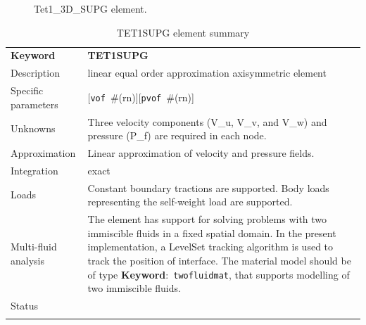 \documentclass[a4paper]{article}
\newcommand{\descitem}[1]{{\noindent \textbf{#1}}:}
\newcommand{\elemkeyword}[1]{\descitem{Keyword}~\param{#1}} %
\newcommand{\param}[1]{\texttt{#1}} %
\newcommand{\optional}[1]{[#1]} %
\newcommand{\field}[2]{\param{#1}~\#{\tiny(#2)}} %
\newcommand{\optField}[2]{\optional{\field{#1}{#2}}}
\newcommand{\templabel}{}%
\newcommand{\tempcaption}{}%
\newcounter{nelpar}
\newenvironment{elementsummary}[5]{%
  \gdef\tempcaption{#4}%
  \gdef\templabel{#5}%
  \setcounter{nelpar}{0}%
  \begin{center} %
    \begin{table}[!htb] %
      \begin{tabular}{|l|p{9cm}|}\hline %
        {\bf Keyword} & \bf{#1}\\ %
        {Description} & {#2}\\ %
        {Specific parameters} & {#3}\\ \hline %
}{
  \\ \hline %
      \end{tabular}%
      \caption{\tempcaption}%
      \label{\templabel}%
    \end{table}%
  \end{center}%
}
\newcommand{\elementDescription}[2]{{#1} & {#2}\\}
\begin{document}
\begin{figure}[htb]
 \centering
 \begin{makeimage}
  
 \end{makeimage}
 \caption{Tet1\_3D\_SUPG element.}
 \label{PY1_3D_SUPGfig}
\end{figure}

\begin{elementsummary}{TET1SUPG}{linear equal order approximation axisymmetric element}
  {\optField{vof}{rn}\optField{pvof}{rn}}{TET1SUPG element summary}{TET1SUPGsummary}
\elementDescription{Unknowns}{Three velocity components (V\_u, V\_v, and V\_w) and pressure (P\_f) are required in each node.}
\elementDescription{Approximation}{Linear approximation of velocity and pressure fields.}
\elementDescription{Integration}{exact}
\elementDescription{Loads}{Constant boundary tractions are supported. Body loads
representing the self-weight load are supported.}
\elementDescription{Multi-fluid analysis}{The element has support for solving
problems with two immiscible fluids in
a fixed spatial domain. In the present implementation, a LevelSet tracking algorithm
is used to track the position of interface. 
The material model should be of type \elemkeyword{twofluidmat}, that
supports modelling of two immiscible fluids.}
\elementDescription{Status}{}
\end{elementsummary}


\end{document}
